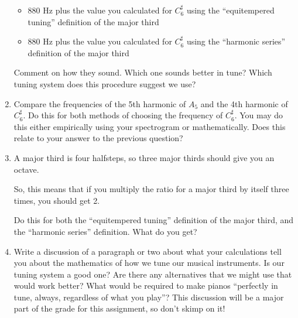 \documentclass[12pt]{article}
\begin{document}
\begin{enumerate}
	\begin{itemize}
	  \item 880 Hz plus the value you calculated for $C^\sharp_6$ using the ``equitempered tuning'' definition of the major third
	  \item 880 Hz plus the value you calculated for $C^\sharp_6$ using the ``harmonic series'' definition of the major third
	\end{itemize}

	Comment on how they sound. Which one sounds better in tune? Which tuning system does this procedure suggest we use?

      \item Compare the frequencies of the 5th harmonic of $A_5$ and the 4th harmonic of $C^\sharp_6$. Do this for both methods of choosing the frequency of $C^\sharp_6$. 
	You may do this either empirically using your spectrogram or mathematically. Does this relate to your answer to the previous question?

      \item A major third is four halfsteps, so three major thirds should give you an octave. 

	So, this means that if you multiply the ratio for a major third by itself three times, you should get 2.

	Do this for both the ``equitempered tuning'' definition of the major third, and the ``harmonic series'' definition. What do you get?

      \item Write a discussion of a paragraph or two about what your calculations tell you about the mathematics of how we tune our musical instruments.
	Is our tuning system a good one? Are there any alternatives that we might use that would work better? What would be required to make pianos ``perfectly in tune,
	always, regardless of what you play''? This discussion will be a major part of the grade for this assignment, so don't skimp on it!
	




    \end{enumerate}

  
\end{document}
